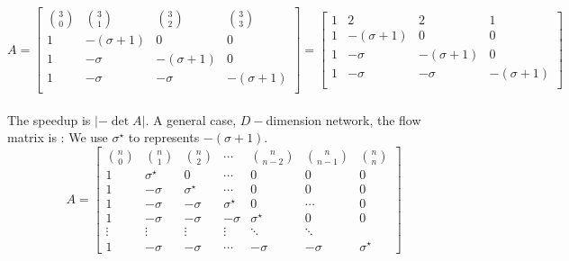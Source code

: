 \begin{equation}
{
A = \left[ \begin{array}{cccc}
{3 \choose 0} & {3 \choose 1} & {3 \choose 2} & {3 \choose 3}\\
1 & -(\sigma + 1) & 0 & 0\\
1 & -\sigma & -(\sigma + 1) & 0\\
1 & -\sigma & -\sigma & -(\sigma + 1)\\
\end{array} 
\right ]
=
\left[ \begin{array}{cccc}
1 & 2 & 2 & 1\\
1 & -(\sigma + 1) & 0 & 0\\
1 & -\sigma & -(\sigma + 1) & 0\\
1 & -\sigma & -\sigma & -(\sigma + 1)\\
\end{array} 
\right ]
} 
\end{equation}
\\

The speedup is $\left | -\det A \right |$.
\newpage
A general case, $D-$dimension network, the flow matrix is :
We use $\sigma^{\star}$ to represents $-(\sigma + 1)$.
\begin{equation*}
     {A = \left[ \begin{array}{ccccccc}
{n \choose 0} & {n \choose 1} & {n \choose 2}  & \cdots & {n \choose n-2} &{n \choose n-1} & {n \choose n} \\
1 & \sigma^{\star} & 0 & \cdots& 0 & 0 & 0\\
1 & -\sigma & \sigma^{\star} & \cdots & 0 & 0 & 0 \\
1 & -\sigma & -\sigma & \sigma^{\star} & 0 & \cdots & 0 \\
1 & -\sigma & -\sigma & -\sigma & \sigma^{\star} & 0 & 0 \\
\vdots & \vdots & \vdots  &   \vdots & \ddots & \ddots\\
1 & -\sigma & -\sigma & \cdots & -\sigma & -\sigma & \sigma^{\star}
\end{array} 
\right ]}
\end{equation*}